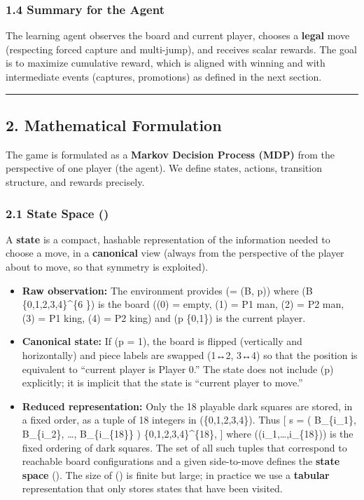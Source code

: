 \documentclass[
]{article}
\providecommand{\tightlist}{%
  \setlength{\itemsep}{0pt}\setlength{\parskip}{0pt}}
\begin{document}
\subsubsection{1.4 Summary for the Agent}\label{summary-for-the-agent}

The learning agent observes the board and current player, chooses a
\textbf{legal} move (respecting forced capture and multi-jump), and
receives scalar rewards. The goal is to maximize cumulative reward,
which is aligned with winning and with intermediate events (captures,
promotions) as defined in the next section.

\begin{center}\rule{0.5\linewidth}{0.5pt}\end{center}

\subsection{2. Mathematical Formulation}\label{mathematical-formulation}

The game is formulated as a \textbf{Markov Decision Process (MDP)} from
the perspective of one player (the agent). We define states, actions,
transition structure, and rewards precisely.

\subsubsection{\texorpdfstring{2.1 State Space
()}{2.1 State Space ()}}\label{state-space}

A \textbf{state} is a compact, hashable representation of the
information needed to choose a move, in a \textbf{canonical} view
(always from the perspective of the player about to move, so that
symmetry is exploited).

\begin{itemize}
\tightlist
\item
  \textbf{Raw observation:} The environment provides (\omega = (B, p))
  where (B \in \{0,1,2,3,4\}\^{}\{6 \}) is the board ((0) =
  empty, (1) = P1 man, (2) = P2 man, (3) = P1 king, (4) = P2 king) and
  (p \in \{0,1\}) is the current player.
\item
  \textbf{Canonical state:} If (p = 1), the board is flipped (vertically
  and horizontally) and piece labels are swapped (1↔2, 3↔4) so that the
  position is equivalent to ``current player is Player 0.'' The state
  does not include (p) explicitly; it is implicit that the state is
  ``current player to move.''
\item
  \textbf{Reduced representation:} Only the 18 playable dark squares are
  stored, in a fixed order, as a tuple of 18 integers in
  (\{0,1,2,3,4\}). Thus {[} s = \bigl( B\_\{i\_1\}, B\_\{i\_2\}, \ldots,
  B\_\{i\_\{18\}\} \bigr) \in \{0,1,2,3,4\}\^{}\{18\}, {]} where
  ((i\_1,\ldots,i\_\{18\})) is the fixed ordering of dark squares. The
  set of all such tuples that correspond to reachable board
  configurations and a given side-to-move defines the \textbf{state
  space} (). The size of () is finite but large;
  in practice we use a \textbf{tabular} representation that only stores
  states that have been visited.
\end{itemize}
\end{document}
